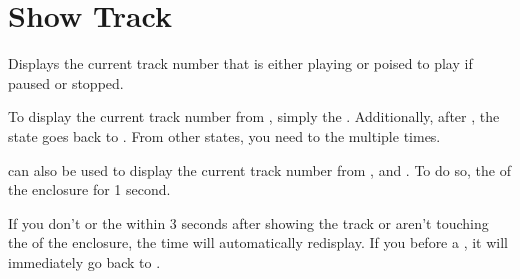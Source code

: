 \section{Show Track} \label{Show Track} 

Displays the current track number that is either playing or poised to play if
paused or stopped.


To display the current track number from , simply  the .
Additionally, after , the state goes back to .
From other states, you need to  the  multiple times.


 can also be used to display the current track number from ,
 and .  To do so,  the  of the enclosure for
\num{1} second.



If you don't  or  the  within \num{3} seconds after
showing the track or aren't touching the  of the enclosure, the time
will automatically redisplay.  If you  before a , it will
immediately go back to .


